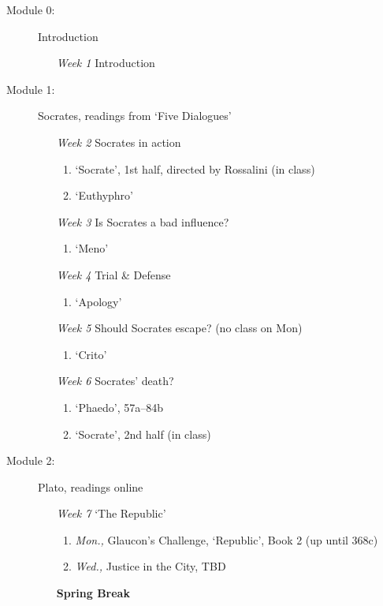 \documentclass[article,oneside]{memoir}
\begin{document}
\begin{description}
\item[Module 0:] {Introduction}
\begin{enumerate}
\item[\textit{Week 1}] Introduction 
\end{enumerate}

\item[Module 1:] Socrates, readings from `Five Dialogues'
\begin{enumerate}
\item[\textit{Week 2}] Socrates in action
\begin{enumerate}
\item `Socrate', 1st half, directed by Rossalini (in class)
\item `Euthyphro'
\end{enumerate}

\item[ \textit{Week 3}] Is Socrates a bad influence? 
\begin{enumerate}
\item `Meno'
\end{enumerate}

\item[ \textit{Week 4}] Trial \& Defense
\begin{enumerate}
\item `Apology'
\end{enumerate}

\item[ \textit{Week 5}] Should Socrates escape? (no class on Mon)
\begin{enumerate}
\item `Crito'
\end{enumerate}
\item[ \textit{Week 6}] Socrates' death? 
\begin{enumerate}
\item `Phaedo', 57a--84b
\item `Socrate', 2nd half (in class) 
\end{enumerate}
\end{enumerate}


\item[Module 2:] Plato, readings online
\begin{enumerate}
\item[\textit{Week 7}] `The Republic'
\begin{enumerate}
\item \emph{Mon.,} Glaucon's Challenge, `Republic', Book 2 (up until 368c) 
\item \emph{Wed.,} Justice in the City, TBD
\end{enumerate}
\item[\textbf{Spring Break}] \


\end{enumerate}
\end{description}
\end{document}
